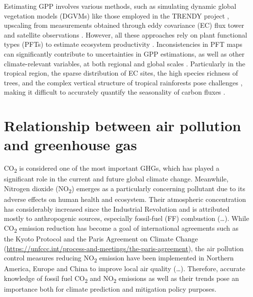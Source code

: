 Estimating GPP involves various methods, such as simulating dynamic global vegetation models (DGVMs) like those employed in the TRENDY project \citep{sitch2015recent, le2018global}, upscaling from measurements obtained through eddy covariance (EC) flux tower and satellite observations \citep{jung2019fluxcom, zeng2020global}. However, all these approaches rely on plant functional types (PFTs) to estimate ecosystem productivity \citep{poulter2011plant, poulter2015plant, lin2021improved, guo2023estimating, yan2023integrating}. Inconsistencies in PFT maps can significantly contribute to uncertainties in GPP estimations, as well as other climate-relevant variables, at both regional and global scales \citep{poulter2011plant}. Particularly in the tropical region, the sparse distribution of EC sites, the high species richness of trees, and the complex vertical structure of tropical rainforests pose challenges \citep{montgomery2001forest}, making it difficult to accurately quantify the seasonality of carbon fluxes \citep{xu2015satellite}. \par

\section{Relationship between air pollution and greenhouse gas}
CO\textsubscript{2} is considered one of the most important GHGs, which has played a significant role in the current and future global climate change. Meanwhile, Nitrogen dioxide (NO\textsubscript{2}) emerges as a particularly concerning pollutant due to its adverse effects on human health and ecosystem. Their atmospheric concentration has considerably increased since the Industrial Revolution and is attributed mostly to anthropogenic sources, especially fossil-fuel (FF) combustion (…). While CO\textsubscript{2} emission reduction has become a goal of international agreements such as the Kyoto Protocol \citep{protocol1997united} and the Paris Agreement on Climate Change (\url{https://unfccc.int/process-and-meetings/the-paris-agreement}), the air pollution control measures reducing NO\textsubscript{2} emission have been implemented in Northern America, Europe and China to improve local air quality (…). Therefore, accurate knowledge of fossil fuel CO\textsubscript{2} and NO\textsubscript{2} emissions as well as their trends pose an importance both for climate prediction and mitigation policy purposes. \par

